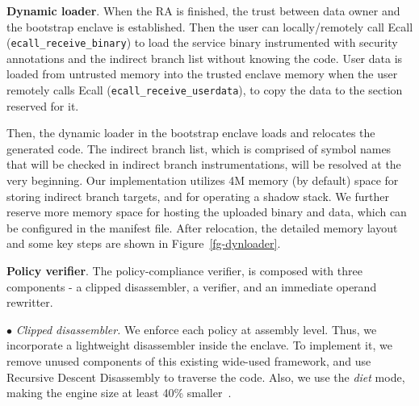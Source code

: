 \vspace{3pt}\noindent\textbf{Dynamic loader}. 
When the RA is finished, the trust between data owner and the bootstrap enclave is established. Then the user can locally/remotely call Ecall (\verb|ecall_receive_binary|) to load the service binary instrumented with security annotations and the indirect branch list without knowing the code. 
User data is loaded from untrusted memory into the trusted enclave memory when the user remotely calls Ecall (\verb|ecall_receive_userdata|), to copy the data to the section reserved for it.


Then, the dynamic loader in the bootstrap enclave loads and relocates the generated code. 
The indirect branch list, which is comprised of symbol names that will be checked in indirect branch instrumentations, will be resolved at the very beginning. 
Our implementation  utilizes 4M memory (by default) space for storing indirect branch targets, and for operating a shadow stack.
We further reserve more memory space for hosting the uploaded binary and data, which can be configured in the manifest file.
After relocation, the detailed memory layout and some key steps are shown in Figure~\ref{fg-dynloader}. %




\vspace{3pt}\noindent\textbf{Policy verifier}.\label{subsec-boundarychecking}
The policy-compliance verifier, is composed with three components - a clipped disassembler, a verifier, and an immediate operand rewritter.

\vspace{2pt}\noindent$\bullet$\textit{ Clipped disassembler.} 
We enforce each policy at assembly level. 
Thus, we incorporate a lightweight disassembler inside the enclave. To implement it, we remove unused components of this existing wide-used framework, and use Recursive Descent Disassembly to traverse the code. Also, we use the \textit{diet} mode, making the engine size at least 40\% smaller~\cite{quynh2014capstone}. 

